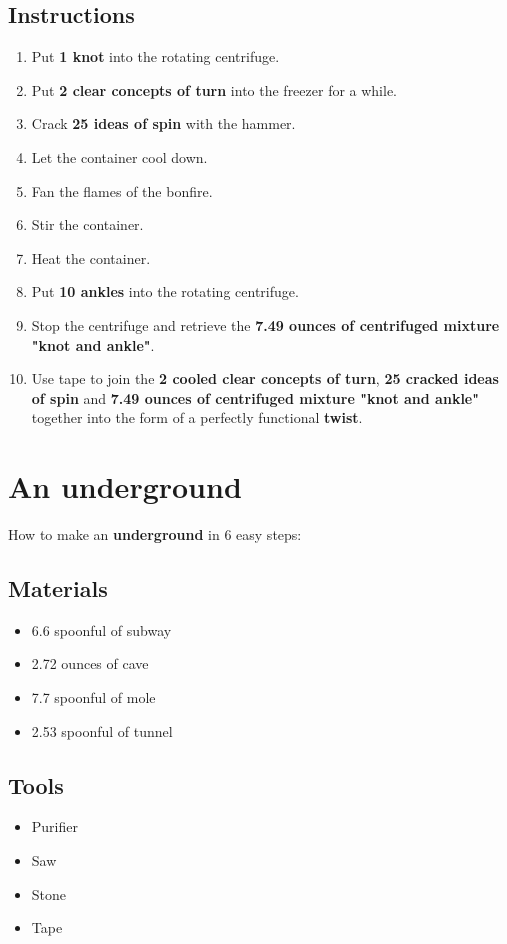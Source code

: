 \documentclass{article}
\begin{document}
\subsection{Instructions}\begin{enumerate}
\item 
Put \textbf{1 knot} into the rotating centrifuge.
\item 
Put \textbf{2 clear concepts of turn} into the freezer for a while.
\item 
Crack \textbf{25 ideas of spin} with the hammer.
\item 
Let the container cool down.
\item 
Fan the flames of the bonfire.
\item 
Stir the container.
\item 
Heat the container.
\item 
Put \textbf{10 ankles} into the rotating centrifuge.
\item 
Stop the centrifuge and retrieve the \textbf{7.49 ounces of centrifuged mixture "knot and ankle"}.
\item 
Use tape to join the \textbf{2 cooled clear concepts of turn}, \textbf{25 cracked ideas of spin} and \textbf{7.49 ounces of centrifuged mixture "knot and ankle"} together into the form of a perfectly functional \textbf{twist}.
\end{enumerate}
\newpage
\section{An underground}How to make an \textbf{underground} in 6 easy steps:

\subsection{Materials}\begin{itemize}
\item 
6.6 spoonful of subway
\item 
2.72 ounces of cave
\item 
7.7 spoonful of mole
\item 
2.53 spoonful of tunnel
\end{itemize}
\subsection{Tools}\begin{itemize}
\item 
Purifier
\item 
Saw
\item 
Stone
\item 
Tape
\end{itemize}
\end{document}
